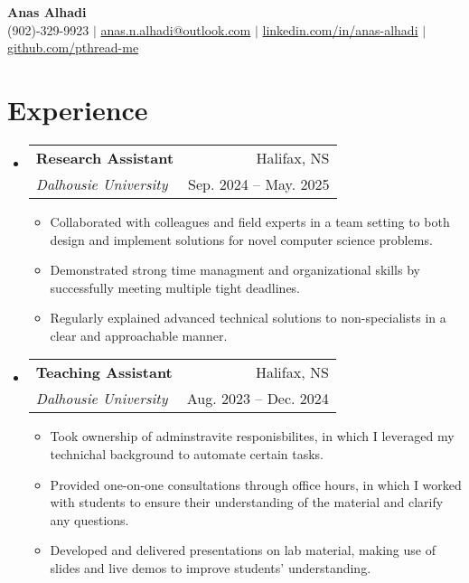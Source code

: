 \documentclass[letterpaper,11pt]{article}
\makeatletter
\newcommand{\resumeItem}[1]{
  \item\small{
    {#1 \vspace{-2pt}}
  }
}
\newcommand{\resumeSubheading}[4]{
  \vspace{-2pt}\item
    \begin{tabular*}{0.97\textwidth}[t]{l@{\extracolsep{\fill}}r}
      \textbf{#1} & #2 \\
			\textit{\small#3} & \small #4 \\
    \end{tabular*}\vspace{-7pt}
}
\newcommand{\resumeSubHeadingListStart}{\begin{itemize}[leftmargin=0.15in, label={}]}
\newcommand{\resumeSubHeadingListEnd}{\end{itemize}}
\newcommand{\resumeItemListStart}{\begin{itemize}}
\newcommand{\resumeItemListEnd}{\end{itemize}\vspace{-5pt}}
\makeatother
\begin{document}

\begin{center}
    \textbf{\Huge Anas Alhadi} \\ \vspace{1pt}
		\vspace{5pt}
		\small (902)-329-9923 $|$ \href{mailto:anas.n.alhadi@outlook.com}{anas.n.alhadi@outlook.com} $|$ 
    \href{https://linkedin.com/in/anas-alhadi}{linkedin.com/in/anas-alhadi} $|$ 
    \href{https://github.com/pthread-me}{github.com/pthread-me}
    
\end{center}




\vspace{1pt}
\section{Experience}
	\vspace{5pt}
  \resumeSubHeadingListStart
	\resumeSubheading
      {Research Assistant}{Halifax, NS}
      {Dalhousie University}{Sep. 2024 -- May. 2025}
      \resumeItemListStart
        \resumeItem{Collaborated with colleagues and field experts in a team setting to both design and implement solutions for novel computer science problems.}
        \resumeItem{Demonstrated strong time managment and organizational skills by successfully meeting multiple tight deadlines.}
				\resumeItem{Regularly explained advanced technical solutions to non-specialists in a clear and approachable manner.}
			\resumeItemListEnd 


	\vspace{15pt}
	\resumeSubheading
	{Teaching Assistant}{Halifax, NS}
      {Dalhousie University}{Aug. 2023 -- Dec. 2024}
      \resumeItemListStart
				\resumeItem{Took ownership of adminstravite responisbilites, in which I leveraged my technichal background to automate certain tasks.}
				\resumeItem{Provided one-on-one consultations through office hours, in which I worked with students to ensure their understanding of the material and clarify any questions.}
				\resumeItem{Developed and delivered presentations on lab material, making use of slides and live demos to improve students' understanding.}
			\resumeItemListEnd 
  \resumeSubHeadingListEnd
\end{document}

